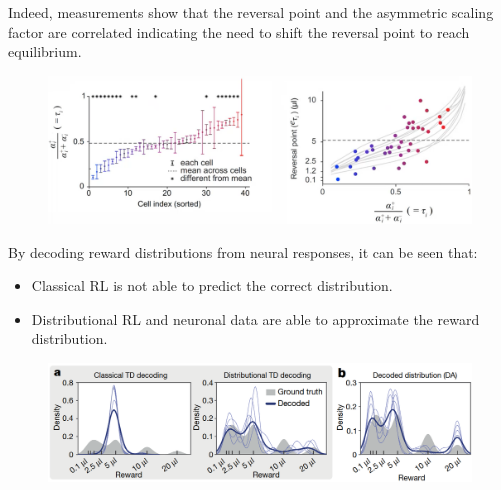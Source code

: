 \begin{casestudy}
    Indeed, measurements show that the reversal point and the asymmetric scaling factor are correlated
    indicating the need to shift the reversal point to reach equilibrium.
    \begin{figure}[H]
        \centering
        \includegraphics[width=0.65\linewidth]{./img/distr_rl7.png}
    \end{figure}

    By decoding reward distributions from neural responses, it can be seen that:
    \begin{itemize}
        \item Classical RL is not able to predict the correct distribution.
        \item Distributional RL and neuronal data are able to approximate the reward distribution.
    \end{itemize}
    \begin{figure}[H]
        \centering
        \includegraphics[width=0.7\linewidth]{./img/distr_rl8.png}
    \end{figure}
\end{casestudy}